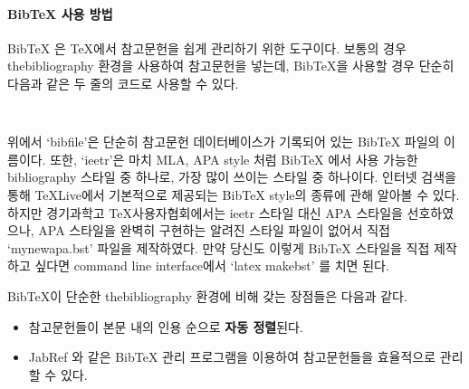 \paragraph{BibTeX 사용 방법}
BibTeX 은 \TeX 에서 참고문헌을 쉽게 관리하기 위한 도구이다. 보통의 경우 thebibliography 환경을 사용하여 참고문헌을 넣는데, BibTeX을 사용할 경우 단순히 다음과 같은 두 줄의 코드로 사용할 수 있다. 
\begin{lstlisting}


\end{lstlisting}
위에서 `bibfile'은 단순히 참고문헌 데이터베이스가 기록되어 있는 BibTeX 파일의 이름이다. 또한, `ieetr'은 마치 MLA, APA style 처럼 BibTeX 에서 사용 가능한 bibliography 스타일 중 하나로, 가장 많이 쓰이는 스타일 중 하나이다. 인터넷 검색을 통해 TeXLive에서 기본적으로 제공되는 BibTeX style의 종류에 관해 알아볼 수 있다. 하지만 경기과학고 \TeX 사용자협회에서는 ieetr 스타일 대신 APA 스타일을 선호하였으나, APA 스타일을 완벽히 구현하는 알려진 스타일 파일이 없어서 직접 `mynewapa.bst' 파일을 제작하였다. 만약 당신도 이렇게 BibTeX 스타일을 직접 제작하고 싶다면 command line interface에서 `latex makebst' 를 치면 된다.

BibTeX이 단순한 thebibliography 환경에 비해 갖는 장점들은 다음과 같다.
\begin{itemize}
	\item 참고문헌들이 본문 내의 인용 순으로 {\bf 자동 정렬}된다.
	\item JabRef 와 같은 BibTeX 관리 프로그램을 이용하여 참고문헌들을 효율적으로 관리할 수 있다.
\end{itemize}

